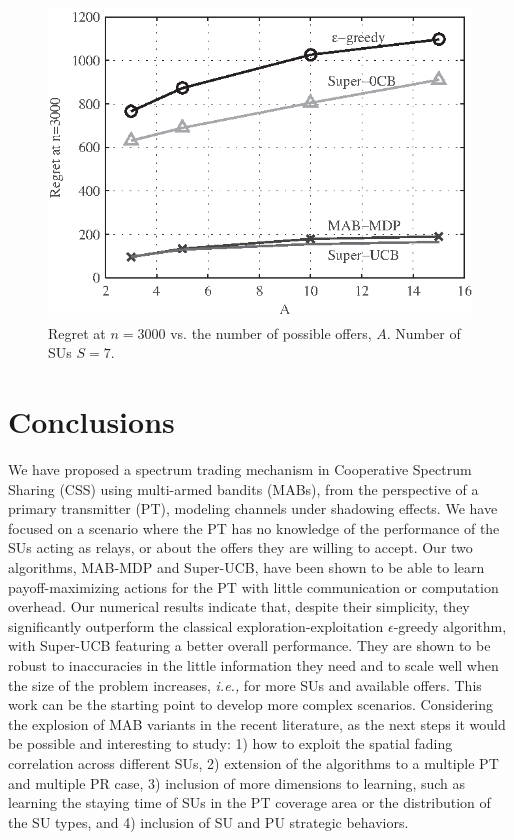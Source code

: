 \begin{figure}[!t]
\centering
\includegraphics{VsA.eps}
\caption{Regret at $n = 3000$ vs. the number of possible offers, $A$. Number of SUs $S = 7$.}
\label{fig:VsA}
\end{figure}

\section{Conclusions}\label{sec:Con}
We have proposed a spectrum trading mechanism in Cooperative Spectrum Sharing (CSS) using multi-armed bandits (MABs), from the perspective of a primary transmitter (PT),  modeling channels under shadowing effects. 
We have focused on a scenario where the PT has no knowledge of the performance of the SUs acting as relays, or about the offers they are willing to accept. 
Our two algorithms, MAB-MDP and Super-UCB, have been shown to be able to learn payoff-maximizing actions for the PT with little communication or computation overhead. 
Our numerical results indicate that, despite their simplicity, they significantly outperform the classical exploration-exploitation $\epsilon$-greedy algorithm, with Super-UCB featuring a better overall performance.
They are shown to be robust to inaccuracies in the little information they need and to scale well when the size of the problem increases, \textit{i.e.,} for more SUs and available offers.
This work can be the starting point to develop more complex scenarios.  
Considering the explosion of MAB variants in the recent literature, as the next steps it would be possible and interesting to study: 1) how to exploit the spatial fading correlation across different SUs, 2) extension of the algorithms to a multiple PT and multiple PR case, 3) inclusion of more dimensions to learning, such as learning the staying time of SUs in the PT coverage area or the distribution of the SU types, and 4) inclusion of SU and PU strategic behaviors. 


